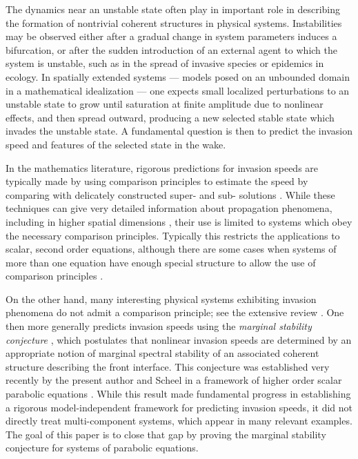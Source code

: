 \documentclass[11pt]{article}
\numberwithin{equation}{section}
\numberwithin{prop}{section}
\begin{document}
The dynamics near an unstable state often play in important role in describing the formation of nontrivial coherent structures in physical systems. Instabilities may be observed either after a gradual change in system parameters induces a bifurcation, or after the sudden introduction of an external agent to which the system is unstable, such as in the spread of invasive species or epidemics in ecology. In spatially extended systems --- models posed on an unbounded domain in a mathematical idealization --- one expects small localized perturbations to an unstable state to grow until saturation at finite amplitude due to nonlinear effects, and then spread outward, producing a new selected stable state which invades the unstable state. A fundamental question is then to predict the invasion speed and features of the selected state in the wake. 

In the mathematics literature, rigorous predictions for invasion speeds are typically made by using comparison principles to estimate the speed by comparing with delicately constructed super- and sub- solutions \cite{Bramson1, Bramson2, Comparison1, Comparison2, Lau, Graham, HamelPeriodic}. While these techniques can give very detailed information about propagation phenomena, including in higher spatial dimensions \cite{hamelnadirashvili, roquejoffre, berestyckinirenberg},  their use is limited to systems which obey the necessary comparison principles. Typically this restricts the applications to scalar, second order equations, although there are some cases when systems of more than one equation have enough special structure to allow the use of comparison principles \cite{BouinHendersonRyzhik1, BouinHendersonRyzhik2, LLWCooperative, LLWCompetitive}. 

On the other hand, many interesting physical systems exhibiting invasion phenomena do not admit a comparison principle; see the extensive review \cite{vanSaarloosReview}. One then more generally predicts invasion speeds using the \emph{marginal stability conjecture} \cite{vanSaarloosReview, colleteckmann, ColletEckmannSH, deelanger, bers1983handbook, brevdo}, which postulates that nonlinear invasion speeds are determined by an appropriate notion of marginal spectral stability of an associated coherent structure describing the front interface. This conjecture was established very recently by the present author and Scheel in a framework of higher order scalar parabolic equations \cite{CAMS}. While this result made fundamental progress in establishing a rigorous model-independent framework for predicting invasion speeds, it did not directly treat multi-component systems, which appear in many relevant examples. The goal of this paper is to close that gap by proving the marginal stability conjecture for systems of parabolic equations.
\end{document}

